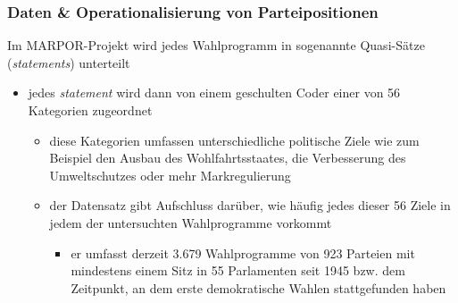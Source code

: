 \documentclass[11pt]{article}
\begin{document}
\subsubsection{Daten \& Operationalisierung von Parteipositionen}
\label{sec:org1d30426}
Im MARPOR-Projekt wird jedes Wahlprogramm in sogenannte Quasi-Sätze (\emph{statements}) unterteilt
\begin{itemize}
\item jedes \emph{statement} wird dann von einem geschulten Coder einer von 56 Kategorien zugeordnet
\begin{itemize}
\item diese Kategorien umfassen unterschiedliche politische Ziele wie zum Beispiel den Ausbau des Wohlfahrtsstaates, die Verbesserung des Umweltschutzes oder mehr Markregulierung
\item der Datensatz gibt Aufschluss darüber, wie häufig jedes dieser 56 Ziele in jedem der untersuchten Wahlprogramme vorkommt
\begin{itemize}
\item er umfasst derzeit 3.679 Wahlprogramme von 923 Parteien mit mindestens einem Sitz in 55 Parlamenten seit 1945 bzw. dem Zeitpunkt, an dem erste demokratische Wahlen stattgefunden haben
\end{itemize}
\end{itemize}
\end{itemize}
\end{document}

